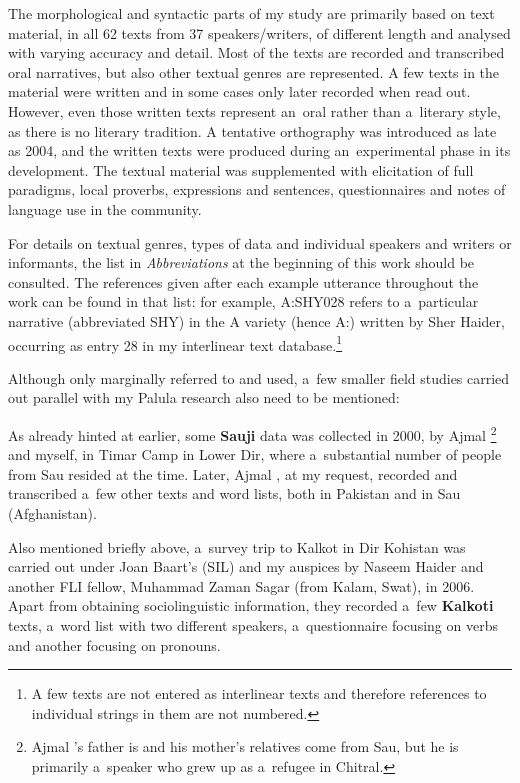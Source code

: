 \largerpage[-1]
The morphological and syntactic parts of my study are primarily based on text material, in all 62
texts from 37 speakers/writers, of different length and analysed with varying accuracy and
detail. Most of the texts are recorded and transcribed oral narratives, but also other textual
genres are represented. A few texts in the material were written and in some cases only later
recorded when read out. However, even those written texts represent an~oral rather than a~literary
style, as there is no literary tradition. A tentative orthography was introduced as late as 2004,
and the written texts were produced during an~experimental phase in its development. The textual
material was supplemented with elicitation of full paradigms, local proverbs, expressions and sentences,
questionnaires and notes of language use in the community.

\largerpage[-1]
For details on textual genres, types of data and individual speakers and writers or informants, the
list in \textit{Abbreviations} at the beginning of this work should be consulted. The references given after
each example utterance throughout the work can be found in that list: for example, A:SHY028 refers to
a~particular narrative (abbreviated SHY) in the A variety (hence A:) written by Sher Haider, occurring as entry 28 in my interlinear text database.\footnote{A few texts are not entered as interlinear texts and therefore references to individual strings in them are not numbered.}


Although only marginally referred to and used, a~few smaller field studies carried out parallel with
my Palula research also need to be mentioned:


As already hinted at earlier, some \textbf{Sauji} data was collected in 2000, by Ajmal
\iliNuristani\footnote{Ajmal \iliNuristani's father is \iliNuristani and his mother's relatives come from Sau,
  but he is primarily a~\iliPashto speaker who grew up as a~refugee in Chitral.} and myself, in Timar
Camp in Lower Dir, where a~substantial number of people from Sau resided at the time. Later, Ajmal
\iliNuristani, at my request, recorded and transcribed a~few other texts and word lists, both in
Pakistan and in Sau (Afghanistan).


Also mentioned briefly above, a~survey trip to Kalkot in Dir Kohistan was carried out under Joan
Baart's (SIL) and my auspices by Naseem Haider and another FLI fellow, Muhammad Zaman Sagar (from
Kalam, Swat), in 2006. Apart from obtaining sociolinguistic information, they recorded a~few
\textbf{Kalkoti} texts, a~word list with two different speakers, a~questionnaire focusing on verbs
and another focusing on pronouns.


